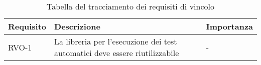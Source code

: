 \begin{table}%
\caption{Tabella del tracciamento dei requisiti di vincolo}
\label{tab:requisiti-vincolo}
\begin{tabularx}{\textwidth}{lXl}
\hline\hline
\textbf{Requisito} & \textbf{Descrizione} & \textbf{Importanza}\\
\hline
RVO-1    & La libreria per l'esecuzione dei test automatici deve essere riutilizzabile & - \\
\hline
\end{tabularx}
\end{table}%